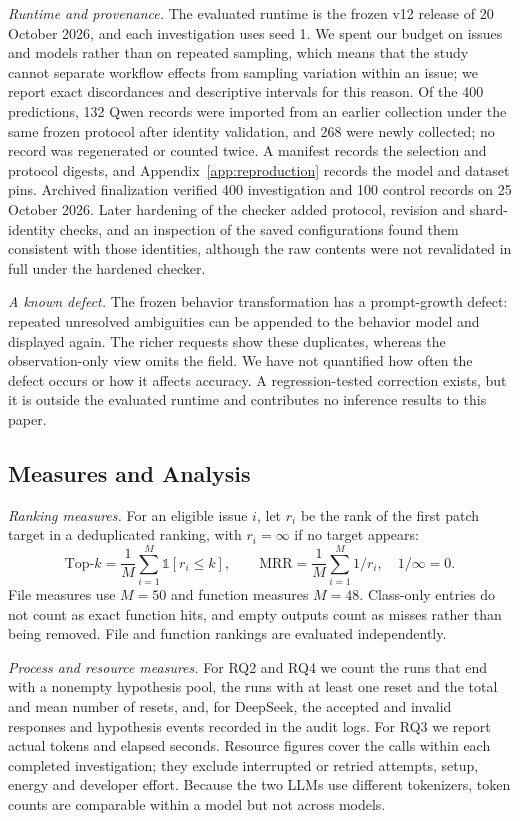 \documentclass[a4paper,fleqn]{cas-sc}
\begin{document}
\emph{Runtime and provenance.} The evaluated runtime is the frozen v12 release of 20 October 2026, and each investigation uses seed 1. We spent our budget on issues and models rather than on repeated sampling, which means that the study cannot separate workflow effects from sampling variation within an issue; we report exact discordances and descriptive intervals for this reason. Of the 400 predictions, 132 Qwen records were imported from an earlier collection under the same frozen protocol after identity validation, and 268 were newly collected; no record was regenerated or counted twice. A manifest records the selection and protocol digests, and Appendix~\ref{app:reproduction} records the model and dataset pins. Archived finalization verified 400 investigation and 100 control records on 25 October 2026. Later hardening of the checker added protocol, revision and shard-identity checks, and an inspection of the saved configurations found them consistent with those identities, although the raw contents were not revalidated in full under the hardened checker.

\emph{A known defect.} The frozen behavior transformation has a prompt-growth defect: repeated unresolved ambiguities can be appended to the behavior model and displayed again. The richer requests show these duplicates, whereas the observation-only view omits the field. We have not quantified how often the defect occurs or how it affects accuracy. A regression-tested correction exists, but it is outside the evaluated runtime and contributes no inference results to this paper.

\subsection{Measures and Analysis}\label{sec:measures}
\emph{Ranking measures.} For an eligible issue $i$, let $r_i$ be the rank of the first patch target in a deduplicated ranking, with $r_i=\infty$ if no target appears:
\begin{equation}\label{eq:metrics}
\mathrm{Top}\mbox{-}k=\frac{1}{M}\sum_{i=1}^{M}\mathbb{1}[r_i\le k],
\qquad
\mathrm{MRR}=\frac{1}{M}\sum_{i=1}^{M}1/r_i,\quad 1/\infty=0.
\end{equation}
File measures use $M=50$ and function measures $M=48$. Class-only entries do not count as exact function hits, and empty outputs count as misses rather than being removed. File and function rankings are evaluated independently.

\emph{Process and resource measures.} For RQ2 and RQ4 we count the runs that end with a nonempty hypothesis pool, the runs with at least one reset and the total and mean number of resets, and, for DeepSeek, the accepted and invalid responses and hypothesis events recorded in the audit logs. For RQ3 we report actual tokens and elapsed seconds. Resource figures cover the calls within each completed investigation; they exclude interrupted or retried attempts, setup, energy and developer effort. Because the two LLMs use different tokenizers, token counts are comparable within a model but not across models.
\end{document}
